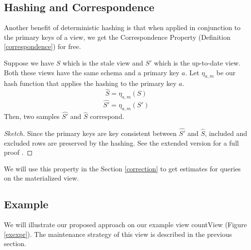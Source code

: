 \subsection{Hashing and Correspondence}
Another benefit of deterministic hashing is that when applied in conjunction to the primary keys of a view, we get the Correspondence Property (Definition \ref{correspondence}) for free.
\begin{proposition}
Suppose we have $S$ which is the stale view and $S'$ which is the up-to-date view.
Both these views have the same schema and a primary key $a$.
Let $\eta_{a, m}$ be our hash function that applies the hashing to the primary key $a$.
\[
\hat{S} = \eta_{a, m}(S)
\]
\[
\hat{S'} = \eta_{a, m}(S')
\]
Then, two samples $\hat{S'}$ and $\hat{S}$ correspond.
\end{proposition}
\begin{proof}[Sketch]
Since the primary keys are key consistent between $\hat{S'}$ and $\hat{S}$, included and excluded rows are preserved by the hashing.
See the extended version for a full proof .

\end{proof}
We will use this property in the Section \ref{correction} to get estimates for queries on the materialized view.

\subsection{Example}
We will illustrate our proposed approach on our example view \textsf{countView} (Figure \ref{exexpr}).
The maintenance strategy of this view is described in the previous section.

